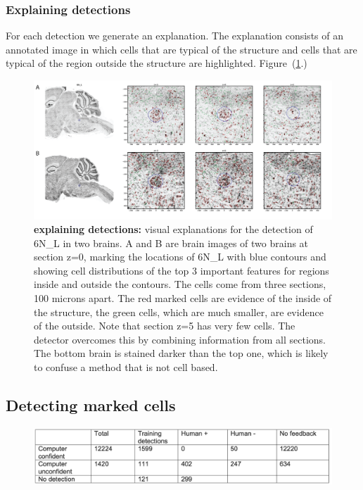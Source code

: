 \documentclass[11pt]{article}
\begin{document}
\subsubsection{Explaining detections}
For each detection we generate an explanation. The explanation
consists of an annotated image in which cells that are typical of the
structure and cells that are typical of the region outside the
structure are highlighted. Figure~(\ref{fig:explaining}.)

\begin{figure}[t]
  \includegraphics[width=\textwidth]{figures/DetectionExplanation.png}
  \caption{\label{fig:explaining} {\bf explaining detections:} visual explanations for the
    detection of 6N\_L in two brains. A and B are brain images of two
    brains at section z=0, marking the locations of 6N\_L with blue
    contours and showing cell distributions of the top 3 important
    features for regions inside and outside the contours.  The cells
    come from three sections, 100 microns apart. The red marked cells
    are evidence of the inside of the structure, the green cells,
    which are much smaller, are evidence of the outside. Note that
    section z=5 has very few cells. The detector overcomes this by
    combining information from all sections.  The bottom brain is
    stained darker than the top one, which is likely to confuse a
    method that is not cell based.}
  \end{figure}

\subsection{Detecting marked cells}

\begin{figure}[t]
  \includegraphics[width=\textwidth]{figures/MarkedCellsDetectionNumbers.png}
\end{figure}
\end{document}
